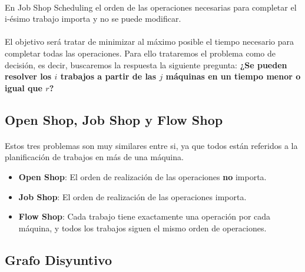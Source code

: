 \documentclass[11pt, a4paper,spanish]{article}
\begin{document}
				\paragraph{}
				En Job Shop Scheduling el orden de las operaciones necesarias para completar el i-ésimo trabajo importa y no se puede modificar.
			 
				\paragraph{}
				El objetivo será tratar de minimizar al máximo posible el tiempo necesario para completar todas las operaciones. Para ello trataremos el problema como de decisión, es decir, buscaremos la respuesta la siguiente pregunta:  
				\newline
				{ \bf ¿Se pueden resolver los $i$ trabajos a partir de las $j$ máquinas en un tiempo menor o igual que $r$?}
				
			\subsection{Open Shop, Job Shop y Flow Shop}
			
				\paragraph{}
				Estos tres problemas son muy similares entre si, ya que todos están referidos a la planificación de trabajos en más de una máquina.
				
				\begin{itemize}
				
					\item {\bf Open Shop}: El orden de realización de las operaciones {\bf no} importa.
					
					\item {\bf Job Shop}: El orden de realización de las operaciones importa.
					
					\item {\bf Flow Shop}: Cada trabajo tiene exactamente una operación por cada máquina, y todos los trabajos siguen el mismo orden de operaciones.
					
				\end{itemize}
			
			\subsection{Grafo Disyuntivo}
			
\end{document}
